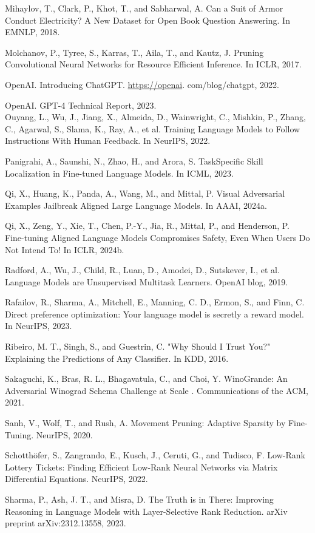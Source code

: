 \documentclass[10pt]{article}
\begin{document}
Mihaylov, T., Clark, P., Khot, T., and Sabharwal, A. Can a Suit of Armor Conduct Electricity? A New Dataset for Open Book Question Answering. In EMNLP, 2018.

Molchanov, P., Tyree, S., Karras, T., Aila, T., and Kautz, J. Pruning Convolutional Neural Networks for Resource Efficient Inference. In ICLR, 2017.

OpenAI. Introducing ChatGPT. \href{https://openai}{https://openai}. com/blog/chatgpt, 2022.

OpenAI. GPT-4 Technical Report, 2023.\\
Ouyang, L., Wu, J., Jiang, X., Almeida, D., Wainwright, C., Mishkin, P., Zhang, C., Agarwal, S., Slama, K., Ray, A., et al. Training Language Models to Follow Instructions With Human Feedback. In NeurIPS, 2022.

Panigrahi, A., Saunshi, N., Zhao, H., and Arora, S. TaskSpecific Skill Localization in Fine-tuned Language Models. In ICML, 2023.

Qi, X., Huang, K., Panda, A., Wang, M., and Mittal, P. Visual Adversarial Examples Jailbreak Aligned Large Language Models. In AAAI, 2024a.

Qi, X., Zeng, Y., Xie, T., Chen, P.-Y., Jia, R., Mittal, P., and Henderson, P. Fine-tuning Aligned Language Models Compromises Safety, Even When Users Do Not Intend To! In ICLR, 2024b.

Radford, A., Wu, J., Child, R., Luan, D., Amodei, D., Sutskever, I., et al. Language Models are Unsupervised Multitask Learners. OpenAI blog, 2019.

Rafailov, R., Sharma, A., Mitchell, E., Manning, C. D., Ermon, S., and Finn, C. Direct preference optimization: Your language model is secretly a reward model. In NeurIPS, 2023.

Ribeiro, M. T., Singh, S., and Guestrin, C. "Why Should I Trust You?" Explaining the Predictions of Any Classifier. In KDD, 2016.

Sakaguchi, K., Bras, R. L., Bhagavatula, C., and Choi, Y. WinoGrande: An Adversarial Winograd Schema Challenge at Scale . Communications of the ACM, 2021.

Sanh, V., Wolf, T., and Rush, A. Movement Pruning: Adaptive Sparsity by Fine-Tuning. NeurIPS, 2020.

Schotthöfer, S., Zangrando, E., Kusch, J., Ceruti, G., and Tudisco, F. Low-Rank Lottery Tickets: Finding Efficient Low-Rank Neural Networks via Matrix Differential Equations. NeurIPS, 2022.

Sharma, P., Ash, J. T., and Misra, D. The Truth is in There: Improving Reasoning in Language Models with Layer-Selective Rank Reduction. arXiv preprint arXiv:2312.13558, 2023.
\end{document}
